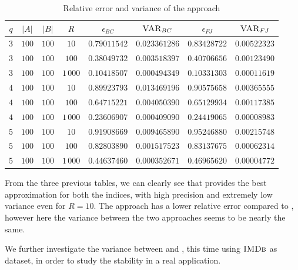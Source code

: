 \begin{table}[h]
	\centering
	\begin{tabular}{|c|c|c|c|c|c|c|c|}
		\hline
		$q$ & $|A|$ & $|B|$ & $R$      & $\epsilon_{BC}$ & $\textsc{VAR}_{BC}$ & $\epsilon_{FJ}$ & $\textsc{VAR}_{FJ}$ \\ \hline \hline
		$3$ & $100$ & $100$ & $10$     & $0.79011542$    & $0.023361286$       & $0.83428722$    & $0.00522323$        \\ \hline
		$3$ & $100$ & $100$ & $100$    & $0.38049732$    & $0.003518397$       & $0.40706656$    & $0.00123490$        \\ \hline
		$3$ & $100$ & $100$ & $1\,000$ & $0.10418507$    & $0.000494349$       & $0.10331303$    & $0.00011619$        \\ \hline \hline
		$4$ & $100$ & $100$ & $10$     & $0.89923793$    & $0.013469196$       & $0.90575658$    & $0.00365555$        \\ \hline
		$4$ & $100$ & $100$ & $100$    & $0.64715221$    & $0.004050390$       & $0.65129934$    & $0.00117385$        \\ \hline
		$4$ & $100$ & $100$ & $1\,000$ & $0.23606907$    & $0.000409090$       & $0.24419065$    & $0.00008983$        \\ \hline \hline
		$5$ & $100$ & $100$ & $10$     & $0.91908669$    & $0.009465890$       & $0.95246880$    & $0.00215748$        \\ \hline
		$5$ & $100$ & $100$ & $100$    & $0.82803890$    & $0.001517523$       & $0.83137675$    & $0.00062314$        \\ \hline
		$5$ & $100$ & $100$ & $1\,000$ & $0.44637460$    & $0.000352671$       & $0.46965620$    & $0.00004772$        \\ \hline
	\end{tabular}
	\caption{Relative error and variance of the \base approach}	
\end{table}

\clearpage

From the three previous tables, we can clearly see that \fcount provides the best approximation for both the indices, 
with high precision and extremely low variance even for $R=10$. 
The \fsamp approach has a lower relative error compared to \base, however here the variance between the two approaches seems to be nearly the same.\medskip

We further investigate the variance between \fsamp and \base, this time using $\textsc{IMDb}$ as dataset,
in order to study the stability in a real application.

